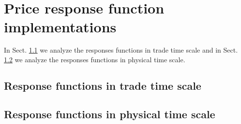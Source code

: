 \section{Price response function implementations}
\label{sec:response_functions_imp}

In Sect. \ref{subsec:response_function_trade} we analyze the responses
functions in trade time scale and in Sect. \ref{subsec:response_function_physical}
we analyze the responses functions in physical time scale.

\subsection{Response functions in trade time scale}
\label{subsec:response_function_trade}

\subsection{Response functions in physical time scale}
\label{subsec:response_function_physical}
